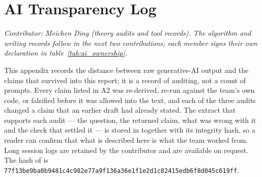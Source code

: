 %

\ifdefined\reportbuild
  \providecommand{\reftext}[2]{#1}
\else
  \providecommand{\reftext}[2]{#2}
\fi

\section{AI Transparency Log}
\label{app:ai_log}

\noindent\textit{Contributor: Meichen Ding (theory audits and tool records). The
algorithm and writing records follow in the next two contributions; each member
signs their own declaration in table~\ref{tab:ai_ownership}.}


This appendix records the distance between raw generative-AI output and the
claims that survived into this report; it is a record of auditing, not a count
of prompts. Every claim listed in A2 was re-derived, re-run against the team's
own code, or falsified before it was allowed into the text, and each of the
three audits changed a claim that an earlier draft had already stated. The extract that supports each audit --- the question, the returned
claim, what was wrong with it and the check that settled it --- is stored in
 together with its integrity hash, so a reader can confirm
that what is described here is what the team worked from. Long session logs are
retained by the contributor and are available on request. The hash of
 is
{\footnotesize\texttt{77f13be9ba0b9481c4c982e77a9f136a36e1f1e2d1c82415edb6f8d045c619ff}}.

